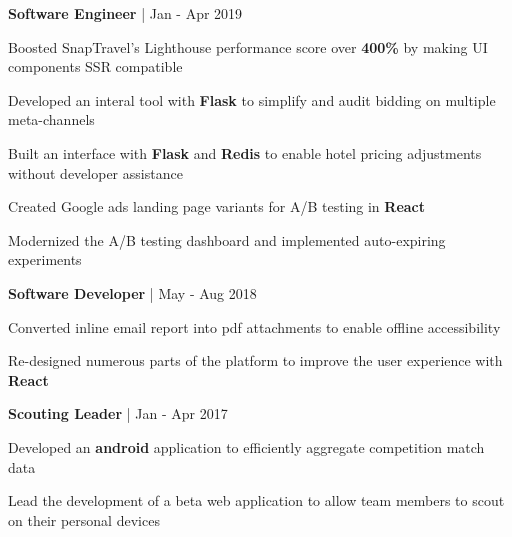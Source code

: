 \begin{cventries}

\cventry
{\textbf{Software Engineer} | \color{awesome}{SnapTravel}}
{Jan - Apr 2019} %
{ %
\begin{cvitems}
\item {Boosted SnapTravel's Lighthouse performance score over \textbf{400\%} by making UI components SSR compatible}
\item {Developed an interal tool with \textbf{Flask} to simplify and audit bidding on multiple meta-channels}
\item {Built an interface with \textbf{Flask} and \textbf{Redis} to enable hotel pricing adjustments without developer assistance}
\item {Created Google ads landing page variants for A/B testing in \textbf{React}}
\item {Modernized the A/B testing dashboard and implemented auto-expiring experiments}
\end{cvitems}
}


\cventry
{\textbf{Software Developer} | \color{awesome}{TemboSocial}}
{May - Aug 2018} %
{ %
\begin{cvitems}
\item {Converted inline email report into pdf attachments to enable offline accessibility}
\item {Re-designed numerous parts of the platform to improve the user experience with \textbf{React}}
\end{cvitems}
}


\cventry
{\textbf{Scouting Leader} | \color{awesome}{FRC Team 610}}
{Jan - Apr 2017} %
{ %
\begin{cvitems}
\item {Developed an \textbf{android} application to efficiently aggregate competition match data}
\item {Lead the development of a beta web application to allow team members to scout on their personal devices}
\end{cvitems}
}


\end{cventries}
